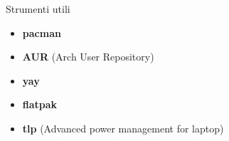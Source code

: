 \begin{frame}{Strumenti utili}
    \begin{itemize}
        \item \textbf{pacman}
        \item \textbf{AUR} (Arch User Repository)
        \item \textbf{yay}
        \item \textbf{flatpak}
        \item \textbf{tlp} (Advanced power management for laptop)
    \end{itemize}
\end{frame}